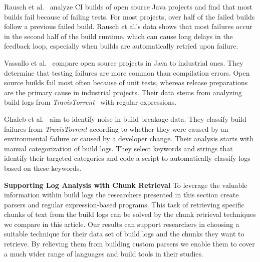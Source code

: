 Rausch et al.~\cite{rausch2017empirical} analyze CI builds of open source Java projects and find that most builds fail because of failing tests.
For most projects, over half of the failed builds follow a previous failed build.
Rausch et al.'s data shows that most failures occur in the second half of the build runtime, which can cause long delays in the feedback loop, especially when builds are automatically retried upon failure.

Vassallo et al.~\cite{vassallo2017a-tale} compare open source projects in Java to industrial ones.
They determine that testing failures are more common than compilation errors.
Open source builds fail most often because of unit tests, whereas release preparations are the primary cause in industrial projects.
Their data stems from analyzing build logs from \emph{TravisTorrent}~\cite{beller2017travistorrent} with regular expressions.

Ghaleb et al.~\cite{ghaleb2019studying} aim to identify noise in build breakage data.
They classify build failures from \emph{TravisTorrent} according to whether they were caused by an environmental failure or caused by a developer change.
Their analysis starts with manual categorization of build logs.
They select keywords and strings that identify their targeted categories and code a script to automatically classify logs based on these keywords.

\noindent
\textbf{Supporting Log Analysis with Chunk Retrieval}
To leverage the valuable information within build logs the researchers presented
in this section create parsers and regular expression-based programs.
This task of retrieving specific chunks of text from the build logs can be
solved by the chunk retrieval techniques we compare in this article.
Our results can support researchers in choosing a suitable technique for their
data set of build logs and the chunks they want to retrieve.
By relieving them from building custom parsers we enable them to cover a much
wider range of languages and build tools in their studies.


